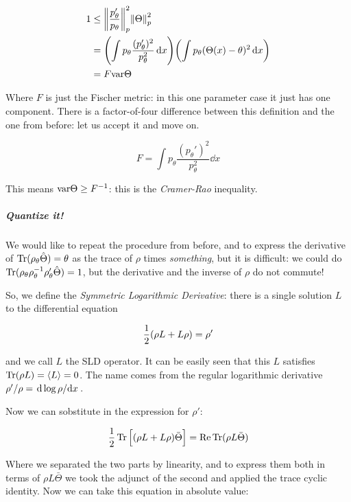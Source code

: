 \documentclass[main.tex]{subfiles}
\begin{document}
\begin{align}
  1 &\leq \norm{\frac{p_\theta '}{p_\theta}}^{2}_p \norm{\Theta}^2_p  \\
  &= \qty(\int  p_\theta \frac{(p_\theta ')^2}{p_\theta^2} \dd{x} )
  \qty(\int p_\theta (\Theta(x) - \theta)^2 \dd{x} )  \\
  &= F \var{\Theta}
\end{align}

Where \( F \) is just the Fischer metric: %
in this one parameter case it just has one component. There is a factor-of-four difference between this definition and the one from before: let us accept it and move on.

\begin{equation}
    F = \int  p_\theta \frac{(p_\theta ')^2}{p_\theta^2} \dd{x}
\end{equation}

This means \(\text{var}{\Theta} \geq F ^{-1} \): this is the \emph{Cramer-Rao} inequality.

\subparagraph{Quantize it!}

We would like to repeat the procedure from before, and to express the derivative of \( \operatorname*{Tr} (\rho_\theta \hat{\Theta}) = \theta \) as the trace of \(\rho\) times \emph{something}, but it is difficult:
we could do \( \operatorname*{Tr} (\rho_\theta \rho_\theta ^{-1} \rho_\theta ' \hat{\Theta}) = 1 \),
but the derivative and the inverse of \(\rho\) do not commute!

So, we define the \emph{Symmetric Logarithmic Derivative}: there is a single solution \(L\) to the differential equation

\begin{equation} \label{eq:SLD-def}
  \frac{1}{2} \qty(\rho L + L \rho) = \rho'
\end{equation}

and we call \(L\) the SLD operator. It can be easily seen that this \(L\) satisfies \(\operatorname*{Tr}(\rho L) = \expval{L} =0 \).
The name comes from the regular logarithmic derivative \( \rho' / \rho = \dv*{\log \rho}{x} \).

Now we can sobstitute in the expression for \(\rho'\):

\begin{equation}
  \frac{1}{2} \Tr \qty[\qty(\rho L + L \rho) \bar{\Theta}] = \Re \Tr (\rho L \bar\Theta)
\end{equation}

Where we separated the two parts by linearity, and to express them both in terms of \(\rho L \bar\Theta\) we took the adjunct of the second and applied the trace cyclic identity.
Now we can take this equation in absolute value:
\end{document}
